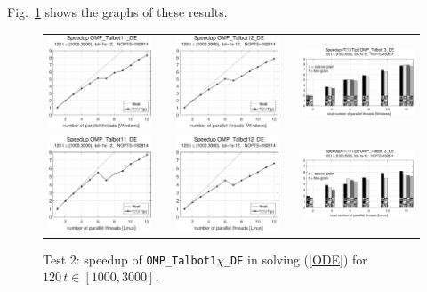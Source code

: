 \documentclass[a4paper,10pt]{report}%
\begin{document}
Fig.~\ref{PAR_EX0a_speedup_test2} shows the graphs of these results.
\begin{figure}[htb]
\centering
\begin{tabular}{ccccc}
\includegraphics[height=0.2\textwidth]{./FIGS/EX0a/EX0a_test2_speedup_11_Windows.eps} &&
\includegraphics[height=0.2\textwidth]{./FIGS/EX0a/EX0a_test2_speedup_12_Windows.eps} &&
\includegraphics[height=0.2\textwidth,keepaspectratio=true]{./FIGS/EX0a/EX0a_test2_speedup_13_Windows.eps} \\
\includegraphics[height=0.2\textwidth]{./FIGS/EX0a/EX0a_test2_speedup_11_Linux.eps} &&
\includegraphics[height=0.2\textwidth]{./FIGS/EX0a/EX0a_test2_speedup_12_Linux.eps} &&
\includegraphics[height=0.2\textwidth,keepaspectratio=true]{./FIGS/EX0a/EX0a_test2_speedup_13_Linux.eps}
\end{tabular}
\caption{\small Test 2: speedup of {\tt OMP\_Talbot1$\chi$\_DE} in solving (\ref{ODE}) for $120\,t\in[1000,3000]$.}
\label{PAR_EX0a_speedup_test2}
\end{figure}
\end{document}

